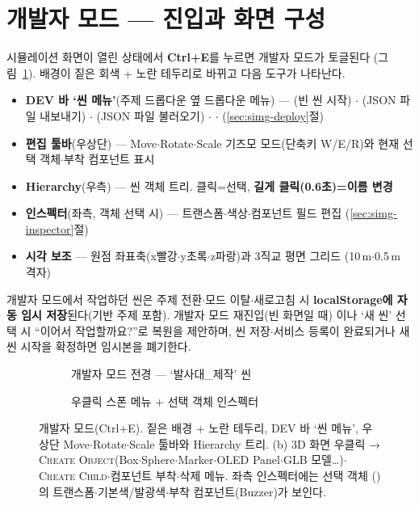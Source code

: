 \section{개발자 모드 --- 진입과 화면 구성}
시뮬레이션 화면이 열린 상태에서 \textbf{Ctrl+E}를 누르면 개발자 모드가 토글된다
(그림~\ref{fig:simg-dev}). 배경이 짙은 회색 + 노란 테두리로 바뀌고 다음 도구가 나타난다.
\begin{itemize}
  \item \textbf{DEV 바 `씬 메뉴'}(주제 드롭다운 옆 드롭다운 메뉴) --- (빈 씬 시작)
  $\cdot$ (JSON 파일 내보내기) $\cdot$ (JSON 파일 불러오기) $\cdot$
   $\cdot$ (\ref{sec:simg-deploy}절)
  \item \textbf{편집 툴바}(우상단) --- Move$\cdot$Rotate$\cdot$Scale 기즈모 모드(단축키 W/E/R)와
  현재 선택 객체$\cdot$부착 컴포넌트 표시
  \item \textbf{Hierarchy}(우측) --- 씬 객체 트리. 클릭=선택, \textbf{길게 클릭(0.6초)=이름 변경}
  \item \textbf{인스펙터}(좌측, 객체 선택 시) --- 트랜스폼$\cdot$색상$\cdot$컴포넌트 필드 편집
  (\ref{sec:simg-inspector}절)
  \item \textbf{시각 보조} --- 원점 좌표축(x빨강$\cdot$y초록$\cdot$z파랑)과 3직교 평면 그리드
  (10\,m$\cdot$0.5\,m 격자)
\end{itemize}
개발자 모드에서 작업하던 씬은 주제 전환$\cdot$모드 이탈$\cdot$새로고침 시
\textbf{localStorage에 자동 임시 저장}된다(기반 주제 포함). 개발자 모드 재진입(빈 화면일 때)
이나 `새 씬' 선택 시 ``이어서 작업할까요?''로 복원을 제안하며, 씬 저장$\cdot$서비스 등록이
완료되거나 새 씬 시작을 확정하면 임시본을 폐기한다.

\begin{figure}[htbp]\centering
  \begin{subfigure}{0.49\linewidth}\centering
    \caption{개발자 모드 전경 --- `발사대\_제작' 씬}
  \end{subfigure}\hfill
  \begin{subfigure}{0.49\linewidth}\centering
    \caption{우클릭 스폰 메뉴 + 선택 객체 인스펙터}
  \end{subfigure}
  \caption{개발자 모드(Ctrl+E). 짙은 배경 + 노란 테두리, DEV 바 `씬 메뉴', 우상단
  Move$\cdot$Rotate$\cdot$Scale 툴바와 Hierarchy 트리. (b) 3D 화면 우클릭 →
  \textsc{Create Object}(Box$\cdot$Sphere$\cdot$Marker$\cdot$OLED Panel$\cdot$GLB 모델…)$\cdot$
  \textsc{Create Child}$\cdot$컴포넌트 부착$\cdot$삭제 메뉴. 좌측 인스펙터에는 선택 객체
  ()의 트랜스폼$\cdot$기본색/발광색$\cdot$부착 컴포넌트(Buzzer)가 보인다.}
  \label{fig:simg-dev}
\end{figure}

